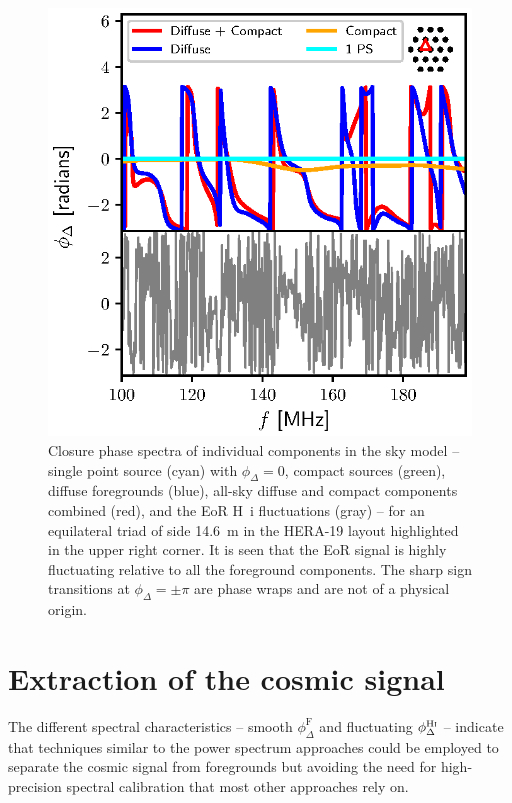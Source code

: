 \documentclass[
reprint,
superscriptaddress,
amsmath,
amssymb,
aps,
prd
]{revtex4-1}
\begin{document}
\begin{figure}[htb]
\includegraphics[width=0.85\linewidth]{closure_phase_spectra_1_15_16}
\caption{Closure phase spectra of individual components in the sky model -- single point source (cyan) with $\phi_\Delta=0$, compact sources (green), diffuse foregrounds (blue), all-sky diffuse and compact components combined (red), and the EoR H~{\sc i} fluctuations (gray) -- for an equilateral triad of side 14.6~m in the HERA-19 layout highlighted in the upper right corner. It is seen that the EoR signal is highly fluctuating relative to all the foreground components. The sharp sign transitions at $\phi_\Delta=\pm \pi$ are phase wraps and are not of a physical origin. \label{fig:cp-spectra}}
\end{figure}

\section{Extraction of the cosmic signal}\label{sec:extraction}

The different spectral characteristics -- smooth $\phi_\Delta^\textrm{F}$ and fluctuating $\phi_\Delta^\textrm{H{\sc i}}$ -- indicate that techniques similar to the power spectrum approaches could be employed to separate the cosmic signal from foregrounds but avoiding the need for high-precision spectral calibration that most other approaches rely on.
\end{document}
